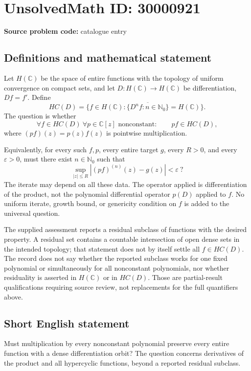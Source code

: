 \documentclass[11pt]{article}
\newcommand{\N}{\mathbb{N}}
\newcommand{\C}{\mathbb{C}}
\begin{document}
\section*{UnsolvedMath ID: 30000921}
\textbf{Source problem code:} catalogue entry
\subsection{Definitions and mathematical statement}
Let $H(\C)$ be the space of entire functions with the topology of uniform convergence on compact sets, and let $D:H(\C)\to H(\C)$ be differentiation, $Df=f'$. Define
\[
 HC(D)=\{f\in H(\C):\overline{\{D^nf:n\in\N_0\}}=H(\C)\}.
\]
The question is whether
\[
 \forall f\in HC(D)\ \forall p\in\C[z]\text{ nonconstant}:\qquad
                   pf\in HC(D),
\]
where $(pf)(z)=p(z)f(z)$ is pointwise multiplication.

Equivalently, for every such $f,p$, every entire target $g$, every $R>0$, and every $\varepsilon>0$, must there exist $n\in\N_0$ such that
\[
 \sup_{|z|\le R}|(pf)^{(n)}(z)-g(z)|<\varepsilon\ ?
\]
The iterate may depend on all these data. The operator applied is differentiation of the product, not the polynomial differential operator $p(D)$ applied to $f$. No uniform iterate, growth bound, or genericity condition on $f$ is added to the universal question.

The supplied assessment reports a residual subclass of functions with the desired property. A residual set contains a countable intersection of open dense sets in the intended topology; that statement does not by itself settle all $f\in HC(D)$. The record does not say whether the reported subclass works for one fixed polynomial or simultaneously for all nonconstant polynomials, nor whether residuality is asserted in $H(\C)$ or in $HC(D)$. Those are partial-result qualifications requiring source review, not replacements for the full quantifiers above.
\subsection{Short English statement}
Must multiplication by every nonconstant polynomial preserve every entire function with a dense differentiation orbit? The question concerns derivatives of the product and all hypercyclic functions, beyond a reported residual subclass.
\end{document}
